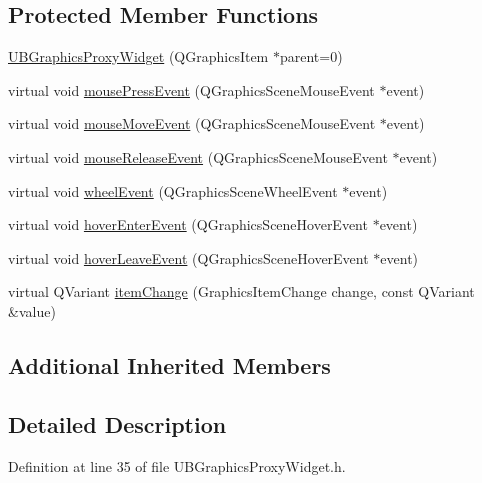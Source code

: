 \subsection*{Protected Member Functions}
\begin{DoxyCompactItemize}
\item 
\hyperlink{class_u_b_graphics_proxy_widget_ac09d1aba5d9732baf11064fd929f7463}{U\-B\-Graphics\-Proxy\-Widget} (Q\-Graphics\-Item $\ast$parent=0)
\item 
virtual void \hyperlink{class_u_b_graphics_proxy_widget_a1694befbd973fcc62055050b14e7dc01}{mouse\-Press\-Event} (Q\-Graphics\-Scene\-Mouse\-Event $\ast$event)
\item 
virtual void \hyperlink{class_u_b_graphics_proxy_widget_a6016e526b18ae33c0377681f80581b6d}{mouse\-Move\-Event} (Q\-Graphics\-Scene\-Mouse\-Event $\ast$event)
\item 
virtual void \hyperlink{class_u_b_graphics_proxy_widget_aab373a0d24d811337f635ac1edf873ba}{mouse\-Release\-Event} (Q\-Graphics\-Scene\-Mouse\-Event $\ast$event)
\item 
virtual void \hyperlink{class_u_b_graphics_proxy_widget_a6ba6a868cb0b9bf501cd3aa965811d31}{wheel\-Event} (Q\-Graphics\-Scene\-Wheel\-Event $\ast$event)
\item 
virtual void \hyperlink{class_u_b_graphics_proxy_widget_a8b75b478b9a0d55b58ef3743df93c3ae}{hover\-Enter\-Event} (Q\-Graphics\-Scene\-Hover\-Event $\ast$event)
\item 
virtual void \hyperlink{class_u_b_graphics_proxy_widget_ae94f6c153aa453490fe25acbba87c6df}{hover\-Leave\-Event} (Q\-Graphics\-Scene\-Hover\-Event $\ast$event)
\item 
virtual Q\-Variant \hyperlink{class_u_b_graphics_proxy_widget_aab2cf669aa69cdbb2582dd13ba6482ab}{item\-Change} (Graphics\-Item\-Change change, const Q\-Variant \&value)
\end{DoxyCompactItemize}
\subsection*{Additional Inherited Members}


\subsection{Detailed Description}


Definition at line 35 of file U\-B\-Graphics\-Proxy\-Widget.\-h.



